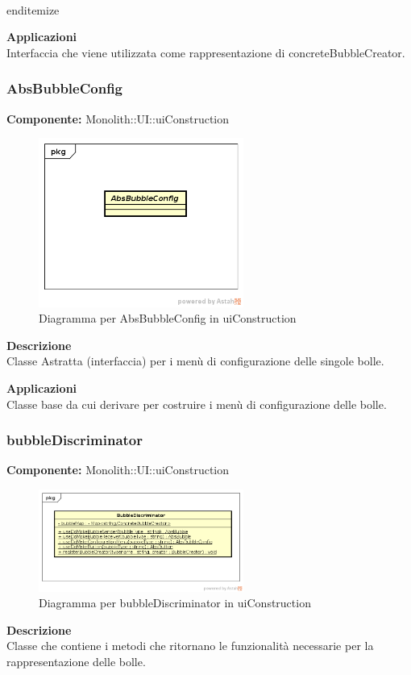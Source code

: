 \\end{itemize} 


\textbf{Applicazioni}\\
Interfaccia che viene utilizzata come rappresentazione di concreteBubbleCreator. 


\clearpage

\subsubsection{AbsBubbleConfig}
\textbf{Componente:}  Monolith::UI::uiConstruction\\
   \FloatBarrier
   \begin{figure}[ht]
   \centering
   \includegraphics[width=0.6\textwidth]{img/single-AbsBubbleConfig}
   \caption{{Diagramma per AbsBubbleConfig in uiConstruction}}
\end{figure}
\FloatBarrier
\textbf{Descrizione}\\
Classe Astratta (interfaccia) per i menù di configurazione delle singole bolle. 


\textbf{Applicazioni}\\
Classe base da cui derivare per costruire i menù di configurazione delle bolle. 


\clearpage

\subsubsection{bubbleDiscriminator}
\textbf{Componente:}  Monolith::UI::uiConstruction\\
   \FloatBarrier
   \begin{figure}[ht]
   \centering
   \includegraphics[width=0.6\textwidth]{img/single-bubbleDiscriminator}
   \caption{{Diagramma per bubbleDiscriminator in uiConstruction}}
\end{figure}
\FloatBarrier
\textbf{Descrizione}\\
Classe che contiene i metodi che ritornano le funzionalità necessarie per la rappresentazione delle bolle.

